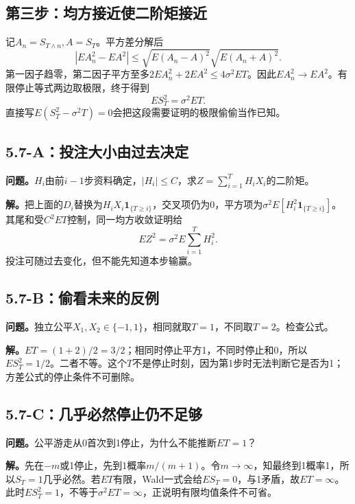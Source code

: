 \documentclass[11pt,a4paper,UTF8,fontset=fandol]{ctexart}
\begin{document}
\subsection{第三步：均方接近使二阶矩接近}\label{ux7b2cux4e09ux6b65ux5747ux65b9ux63a5ux8fd1ux4f7fux4e8cux9636ux77e9ux63a5ux8fd1}

记\(A_n=S_{T\wedge n},A=S_T\)。平方差分解后
\[|EA_n^2-EA^2|\le\sqrt{E(A_n-A)^2}\sqrt{E(A_n+A)^2}.\]
第一因子趋零，第二因子平方至多\(2EA_n^2+2EA^2\le4\sigma^2ET\)。因此\(EA_n^2\to EA^2\)。有限停止等式两边取极限，终于得到
\[\boxed{ES_T^2=\sigma^2ET.}\]
直接写\(E(S_T^2-\sigma^2T)=0\)会把这段需要证明的极限偷偷当作已知。

\subsection{5.7-A：投注大小由过去决定}\label{aux6295ux6ce8ux5927ux5c0fux7531ux8fc7ux53bbux51b3ux5b9a}

\textbf{问题。}\(H_i\)由前\(i-1\)步资料确定，\(|H_i|\le C\)，求\(Z=\sum_{i=1}^TH_iX_i\)的二阶矩。

\textbf{解。}把上面的\(D_i\)替换为\(H_iX_i\mathbf1_{\{T\ge i\}}\)，交叉项仍为0，平方项为\(\sigma^2E[H_i^2\mathbf1_{\{T\ge i\}}]\)。其尾和受\(C^2ET\)控制，同一均方收敛证明给
\[\boxed{EZ^2=\sigma^2E\sum_{i=1}^TH_i^2.}\]
投注可随过去变化，但不能先知道本步输赢。

\subsection{5.7-B：偷看未来的反例}\label{bux5077ux770bux672aux6765ux7684ux53cdux4f8b}

\textbf{问题。}独立公平\(X_1,X_2\in\{-1,1\}\)，相同就取\(T=1\)，不同取\(T=2\)。检查公式。

\textbf{解。}\(ET=(1+2)/2=3/2\)；相同时停止平方1，不同时停止和0，所以\(ES_T^2=1/2\)。二者不等。这个\(T\)不是停止时刻，因为第1步时无法判断它是否为1；方差公式的停止条件不可删除。

\subsection{5.7-C：几乎必然停止仍不足够}\label{cux51e0ux4e4eux5fc5ux7136ux505cux6b62ux4ecdux4e0dux8db3ux591f}

\textbf{问题。}公平游走从0首次到1停止，为什么不能推断\(ET=1\)？

\textbf{解。}先在\(-m\)或1停止，先到1概率\(m/(m+1)\)。令\(m\to\infty\)，知最终到1概率1，所以\(S_T=1\)几乎必然。若\(ET\)有限，Wald一式会给\(ES_T=0\)，与1矛盾，故\(ET=\infty\)。此时\(ES_T^2=1\)，不等于\(\sigma^2ET=\infty\)，正说明有限均值条件不可省。
\end{document}

